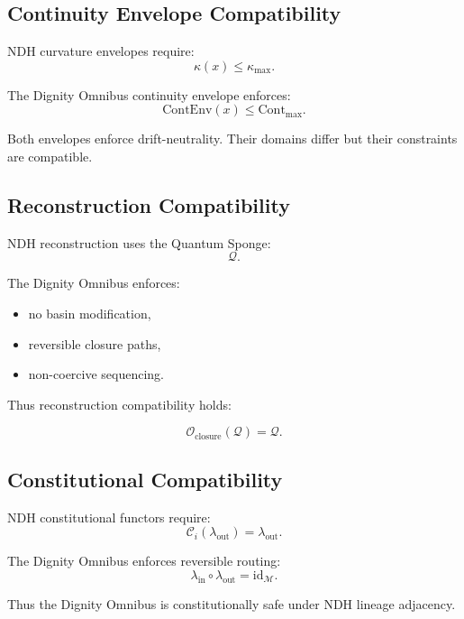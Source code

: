 \subsection{Continuity Envelope Compatibility}

NDH curvature envelopes require:
\[
\kappa(x) \le \kappa_{\max}.
\]

The Dignity Omnibus continuity envelope enforces:
\[
\mathrm{ContEnv}(x) \le \mathrm{Cont}_{\max}.
\]

Both envelopes enforce drift-neutrality. Their domains differ but their
constraints are compatible.


\subsection{Reconstruction Compatibility}

NDH reconstruction uses the Quantum Sponge:
\[
\mathcal{Q}.
\]

The Dignity Omnibus enforces:
\begin{itemize}
    \item no basin modification,
    \item reversible closure paths,
    \item non-coercive sequencing.
\end{itemize}

Thus reconstruction compatibility holds:

\[
\mathcal{O}_{\mathrm{closure}}(\mathcal{Q}) = \mathcal{Q}.
\]


\subsection{Constitutional Compatibility}

NDH constitutional functors require:
\[
\mathcal{C}_i(\lambda_{\mathrm{out}}) = \lambda_{\mathrm{out}}.
\]

The Dignity Omnibus enforces reversible routing:
\[
\lambda_{\mathrm{in}} \circ \lambda_{\mathrm{out}} = \mathrm{id}_{\mathcal{M}}.
\]

Thus the Dignity Omnibus is constitutionally safe under NDH lineage adjacency.

